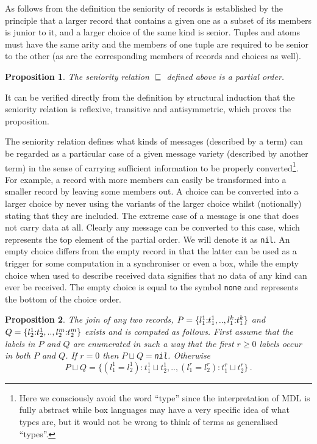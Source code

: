 \documentclass[11pt]{report}
\begin{document}
As follows from the definition the seniority of records is established by the principle that a larger record that contains a given one as a subset of its members is junior to it, and a larger choice of the same kind is senior. Tuples and atoms must have the same arity and the members of one tuple are required to be senior to the other (as are the corresponding members of records and choices as well).

\newtheorem{prop}{Proposition}
\begin{prop}
The seniority relation $\sqsubseteq$ defined above is a partial order.
\end{prop}
It can be verified directly from the definition by structural induction that the seniority relation is reflexive, transitive and antisymmetric, which proves the proposition.

The seniority relation defines what kinds of messages (described by a term) can be regarded as a particular case of a given message variety (described by another term) in the sense
of carrying sufficient information to be properly converted\footnote{Here we consciously avoid
the word ``type'' since the interpretation of MDL is fully abstract while box languages may have
a very specific idea of what types are, but it would not be wrong to think of terms as generalised ``types''.}.
For example, a record
with more members can easily be transformed into a smaller record by leaving some members out. A choice can be converted into a larger choice by never using the variants of the larger choice whilst (notionally) stating that they are included.
The extreme case of a message is one that does not carry data at all. Clearly any message can be converted to this case, which represents the top element of the partial order. We will denote it as \verb"nil". An empty choice differs from the empty record in that the latter can be used as a trigger for some computation in a synchroniser or even a box, while the empty choice when used to describe received data signifies that no data of any kind can ever be received. The empty choice is equal to 
the symbol \verb$none$ and represents the bottom of the choice order.


\begin{prop}
The join of any two records, $P=\{l^1_1\hbox{\rm :}t_1^1,..,l^k_1\hbox{\rm :}t^k_1\}$
and $Q=\{l^1_2\hbox{\rm :}t^1_2,..,l^m_2\hbox{\rm :}t^m_2\}$ exists and is computed
as follows. First assume that the labels in $P$ and $Q$ are enumerated in such a way that
the first $r\ge0$ labels occur in both $P$ and $Q$. If $r=0$ then $P\sqcup Q=$\verb"nil".
Otherwise
\[
P\sqcup Q=\{(l^1_1=l^1_2):t^1_1\sqcup t^1_2,..,(l^r_1=l^r_2):t^r_1\sqcup t^r_2\}\,.
\]

\end{prop}
\end{document}

